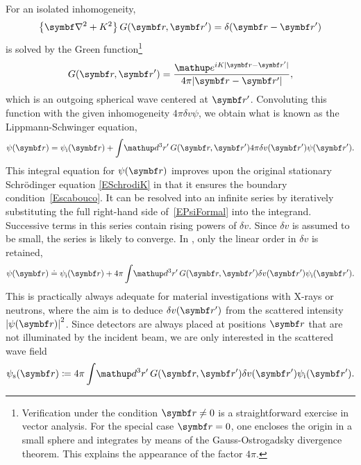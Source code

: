 For an isolated inhomogeneity,
\begin{equation}\label{EHelmholtzForGreen}
  \left\{\Nabla^2+K^2\right\}G(\r,\r') = \delta(\r-\r')
\end{equation}
%
%
is solved by the Green function\footnote
{Verification under the condition $\r\ne0$
is a straightforward exercise in vector analysis.
For the special case $\r=0$,
one encloses the origin in a small sphere
and integrates by means of the Gauss-Ostrogadsky divergence theorem.
This explains the appearance of the factor $4\pi$.}
\begin{equation}\label{EGreens1}
  G(\r,\r') = \frac{\e^{iK|\r-\r'|}}{4\pi |\r-\r'|},
\end{equation}
which is an outgoing spherical wave centered at $\r'$.
Convoluting this function with the given inhomogeneity $4\pi\delta v\psi$,
we obtain what is known as the Lippmann-Schwinger equation,
\begin{equation}\label{EPsiFormal}
  \psi(\r)
  = \psi_\ti(\r)
  + \int\!\d^3r'\, G(\r,\r') 4\pi\delta v(\r')\psi(\r').
\end{equation}
This integral equation for $\psi(\r)$ improves
upon the original stationary Schrödinger equation \cref{ESchrodiK}
in that it ensures the boundary condition~\cref{Escabouco}.
It can be resolved into an infinite series
by iteratively substituting the full right-hand side of~\cref{EPsiFormal}
into the integrand.
Successive terms in this series contain rising powers of $\delta v$.
Since $\delta v$ is assumed to be small, the series is likely to converge.
In ,
only the linear order in $\delta v$ is retained,
\begin{equation}\label{EBorn}
  \psi(\r)
  \doteq \psi_\ti(\r)
  + 4\pi \int\!\d^3r'\, G(\r,\r') \delta v(\r') \psi_\ti(\r').
\end{equation}
This is practically always adequate for
material investigations with X-rays or neutrons,
where the aim is to
deduce $\delta v(\r')$ from the scattered intensity ${|\psi(\r)|}^2$.
Since detectors are always placed at positions $\r$
that are not illuminated by the incident beam,
we are only interested in the scattered wave field
\begin{equation}\label{EBornS}
  \psi_\text{s}(\r)
  \coloneqq
  4\pi \int\!\d^3r'\, G(\r,\r') \delta v(\r') \psi_\ti(\r').
\end{equation}
%
%

